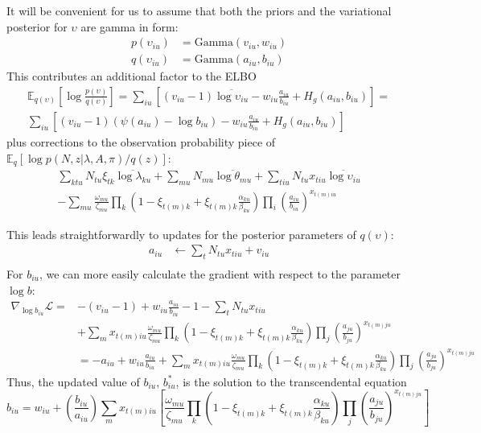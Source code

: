 \documentclass[11pt]{article}
\begin{document}
It will be convenient for us to assume that both the priors and the variational posterior for $\upsilon$ are gamma in form:
\begin{align}
    p(\upsilon_{iu}) &= \mathrm{Gamma}(v_{iu}, w_{iu}) \\
    q(\upsilon_{iu}) &= \mathrm{Gamma}(a_{iu}, b_{iu}) 
\end{align}
This contributes an additional factor to the ELBO
\begin{multline}
    \mathbb{E}_{q(\upsilon)} \left[ \log \frac{p(\upsilon)}{q(\upsilon)} \right] =
    \sum_{iu} \left[ (v_{iu} - 1) \overline{\log \upsilon_{iu}} - w_{iu} \frac{a_{iu}}{b_{iu}} + H_g(a_{iu}, b_{iu}) \right] =\\
    \sum_{iu} \left[ (v_{iu} - 1) (\psi(a_{iu}) - \log b_{iu}) - w_{iu} \frac{a_{iu}}{b_{iu}} + H_g(a_{iu}, b_{iu}) \right]
\end{multline}
plus corrections to the observation probability piece of $\mathbb{E}_q[\log p(N, z|\lambda, A, \pi) / q(z)]$:
\begin{multline}
    \sum_{ktu} N_{tu} \xi_{tk} \overline{\log \lambda_{ku}} + \sum_{mu} N_{mu} \overline{\log \theta_{mu}} + \sum_{tiu} N_{tu} x_{tiu} \overline{\log \upsilon_{iu}} \\
    - \sum_{mu} \frac{\omega_{mu}}{\zeta_{mu}} \prod_k \left( 1 - \xi_{t(m)k} + \xi_{t(m)k} \frac{\alpha_{ku}}{\beta_{ku}}\right)\prod_i \left(\frac{a_{iu}}{b_{iu}} \right)^{x_{t(m)iu}}
\end{multline}

This leads straightforwardly to updates for the posterior parameters of $q(\upsilon)$:
\begin{align}
    a_{iu} &\leftarrow \sum_t N_{tu} x_{tiu} + v_{iu} \\
\end{align}
For $b_{iu}$, we can more easily calculate the gradient with respect to the parameter $\log b$:
\begin{align}
    \nabla_{\log b_{iu}} \mathcal{L} = &-(v_{iu} - 1) + 
    w_{iu} \frac{a_{iu}}{b_{iu}} - 1 - \sum_t N_{tu} x_{tiu} \\
    & + \sum_m x_{t(m)iu} \frac{\omega_{mu}}{\zeta_{mu}} 
    \prod_k \left(1 - \xi_{t(m)k} + \xi_{t(m)k} 
    \frac{\alpha_{ku}}{\beta_{ku}}\right)
    \prod_j \left(\frac{a_{ju}}{b_{ju}}\right)^{x_{t(m)ju}} \\
    &= -a_{iu} + w_{iu} \frac{a_{iu}}{b_{iu}} 
    + \sum_m x_{t(m)iu} \frac{\omega_{mu}}{\zeta_{mu}} 
    \prod_k \left(1 - \xi_{t(m)k} + \xi_{t(m)k} 
    \frac{\alpha_{ku}}{\beta_{ku}}\right)
    \prod_j \left(\frac{a_{ju}}{b_{ju}}\right)^{x_{t(m)ju}} 
\end{align}
Thus, the updated value of $b_{iu}$, $b^*_{iu}$, is the solution to the transcendental equation
\begin{equation}
    b_{iu} = w_{iu} + \left( \frac{b_{iu}}{a_{iu}}\right) \sum_{m} x_{t(m)iu}\left[ \frac{\omega_{mu}}{\zeta_{mu}} \prod_k \left( 1 - \xi_{t(m)k} + \xi_{t(m)k} \frac{\alpha_{ku}}{\beta_{ku}}\right)\prod_{j} \left(\frac{a_{ju}}{b_{ju}} \right)^{x_{t(m)ju}} \right]  
\end{equation}
\end{document}
